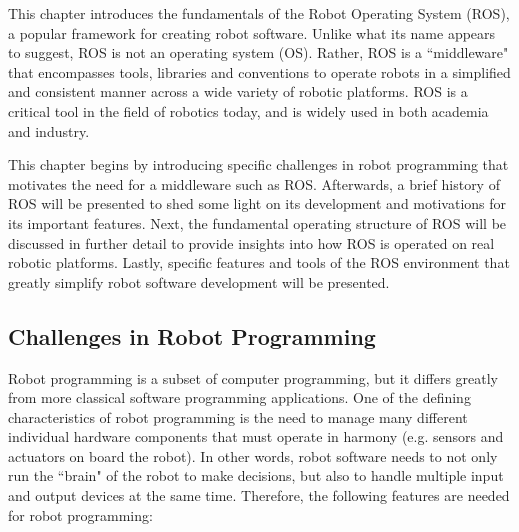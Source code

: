 This chapter introduces the fundamentals of the Robot Operating System (ROS)\cite{Joseph2018}\cite[\baselineskip]{QuigleyGerkeyEtAl2015}, a popular framework for creating robot software. Unlike what its name appears to suggest, ROS is not an operating system (OS). Rather, ROS is a ``middleware" that encompasses tools, libraries and conventions to operate robots in a simplified and consistent manner across a wide variety of robotic platforms. ROS is a critical tool in the field of robotics today, and is widely used in both academia and industry. 

This chapter begins by introducing specific challenges in robot programming that motivates the need for a middleware such as ROS.
Afterwards, a brief history of ROS will be presented to shed some light on its development and motivations for its important features.
Next, the fundamental operating structure of ROS will be discussed in further detail to provide insights into how ROS is operated on real robotic platforms. 
Lastly, specific features and tools of the ROS environment that greatly simplify robot software development will be presented.

\subsection{Challenges in Robot Programming}
Robot programming is a subset of computer programming, but it differs greatly from more classical software programming applications. One of the defining characteristics of robot programming is the need to manage many different individual hardware components that must operate in harmony (e.g. sensors and actuators on board the robot). In other words, robot software needs to not only run the ``brain" of the robot to make decisions, but also to handle multiple input and output devices at the same time. Therefore, the following features are needed for robot programming:

